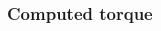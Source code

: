 \begin{frame}
\frametitle{Computed torque}
%
\begin{columns}
	\begin{column}{0.5\textwidth}
	\begin{figure}
	\end{figure}
	\end{column}
	\begin{column}{0.5\textwidth}
	\begin{figure}
	\end{figure}
	\end{column}
\end{columns}
\end{frame}
